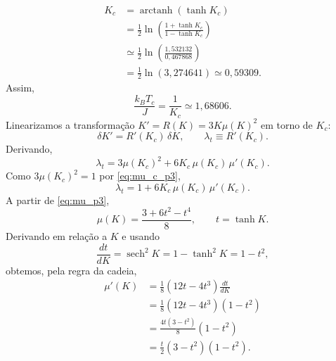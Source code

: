 \documentclass[12pt,a4paper]{article}
\begin{document}
%
\begin{align}
    K_c
    &=
    \operatorname{arctanh}
    \left(
        \tanh K_c
    \right)
    \nonumber\\[4pt]
    &=
    \frac12
    \ln
    \left(
        \frac{
            1+\tanh K_c
        }{
            1-\tanh K_c
        }
    \right)
    \nonumber\\[4pt]
    &\simeq
    \frac12
    \ln
    \left(
        \frac{1{,}532132}{0{,}467868}
    \right)
    \nonumber\\[4pt]
    &=
    \frac12
    \ln(3{,}274641)
    \simeq
    0{,}59309.
    \label{eq:Kc_p3}
\end{align}
%
Assim,
%
\begin{equation}
    \boxed{
    \frac{k_BT_c}{J}
    =
    \frac{1}{K_c}
    \simeq
    1{,}68606.
    }
    \label{eq:Tc_p3}
\end{equation}
% 
Linearizamos a transformação \(K'=R(K)=3K\mu(K)^2\) em torno de
\(K_c\):
%
\begin{equation}
    \delta K'
    =
    R'(K_c)\,\delta K,
    \qquad
    \lambda_t
    \equiv
    R'(K_c).
    \label{eq:linearization_p3}
\end{equation}
%
Derivando,
%
\begin{equation}
    \lambda_t
    =
    3\mu(K_c)^2
    +
    6K_c\,\mu(K_c)\,\mu'(K_c).
    \label{eq:lambda_form_p3}
\end{equation}
%
Como \(3\mu(K_c)^2=1\) por \eqref{eq:mu_c_p3},
%
\begin{equation}
    \boxed{
    \lambda_t
    =
    1
    +
    6K_c\,\mu(K_c)\,\mu'(K_c).
    }
    \label{eq:lambda_p3}
\end{equation}
%
A partir de \eqref{eq:mu_p3},
%
\begin{equation}
    \mu(K)
    =
    \frac{3+6t^2-t^4}{8},
    \qquad
    t=\tanh K.
\end{equation}
%
Derivando em relação a \(K\) e usando
%
\begin{equation}
    \frac{dt}{dK}
    =
    \operatorname{sech}^2 K
    =
    1-\tanh^2 K
    =
    1-t^2,
    \label{eq:dt_dK_p3}
\end{equation}
%
obtemos, pela regra da cadeia,
%
\begin{align}
    \mu'(K)
    &=
    \frac18
    \left(
        12t-4t^3
    \right)
    \frac{dt}{dK}
    \nonumber\\[4pt]
    &=
    \frac18
    \left(
        12t-4t^3
    \right)
    (1-t^2)
    \nonumber\\[4pt]
    &=
    \frac{4t(3-t^2)}{8}
    (1-t^2)
    \nonumber\\[4pt]
    &=
    \frac{t}{2}
    (3-t^2)(1-t^2).
    \label{eq:mu_prime_p3}
\end{align}
\end{document}
